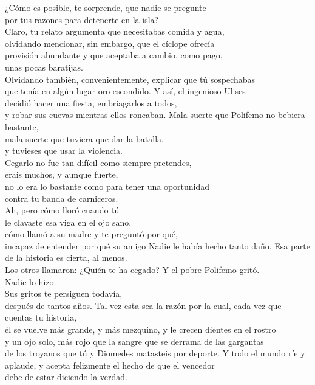 \begin{versopropio}
¿Cómo es posible, te sorprende, que nadie se pregunte\\
por tus razones para detenerte en la isla?\\
Claro, tu relato argumenta que necesitabas comida y agua,\\
olvidando mencionar, sin embargo, que el cíclope ofrecía\\
provisión abundante y que aceptaba a cambio, como pago,\\
unas pocas baratijas.\\
Olvidando también, convenientemente, explicar que tú sospechabas\\
que tenía en algún lugar oro escondido. Y así, el ingenioso Ulises\\
decidió hacer una fiesta, embriagarlos a todos,\\
y robar sus cuevas mientras ellos roncaban.
\stanzabreak
Mala suerte que Polifemo no bebiera bastante,\\
mala suerte que tuviera que dar la batalla,\\
y tuvieses que usar la violencia.\\
Cegarlo no fue tan difícil como siempre pretendes,\\
erais muchos, y aunque fuerte,\\
no lo era lo bastante como para tener una oportunidad\\
contra tu banda de carniceros.\\
Ah, pero cómo lloró cuando tú\\
le clavaste esa viga en el ojo sano,\\
cómo llamó a su madre y te preguntó por qué,\\
incapaz de entender por qué su amigo Nadie le había hecho tanto daño.
\stanzabreak
Esa parte de la historia es cierta, al menos.\\
Los otros llamaron: ¿Quién te ha cegado? Y el pobre Polifemo gritó.\\
Nadie lo hizo.\\
Sus gritos te persiguen todavía,\\
después de tantos años.
\stanzabreak
Tal vez esta sea la razón por la cual, cada vez que cuentas tu historia,\\
él se vuelve más grande, y más mezquino, y le crecen dientes en el rostro\\
y un ojo solo, más rojo que la sangre que se derrama de las gargantas\\
de los troyanos que tú y Diomedes matasteis por deporte.
\stanzabreak
Y todo el mundo ríe y aplaude, y acepta felizmente el hecho de que el vencedor\\
debe de estar diciendo la verdad.
\end{versopropio}
